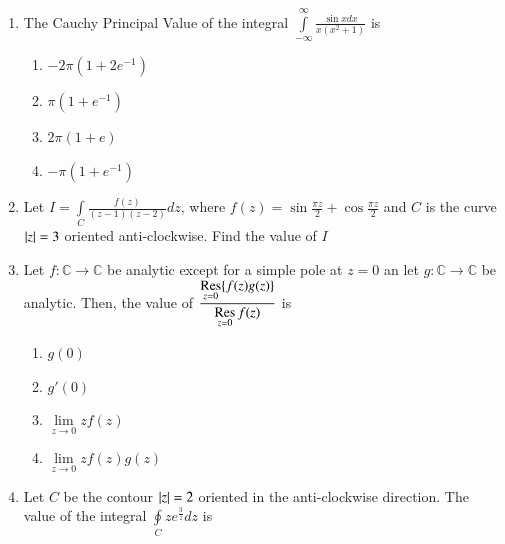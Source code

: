 \documentclass[journal,12pt,twocolumn]{IEEEtran}
\begin{document}
\begin{enumerate}[1.]
\begin{enumerate}
\end{enumerate}

\item The Cauchy Principal Value of the integral $\int\limits_{-\infty}^{\infty} \frac{\sin x dx}{x(x^2+1)} $ is


\begin{enumerate}

\item $
-2 \pi(1+2 e^{-1})
$

\item $
\pi(1+e^{-1})
$

\item $
2 \pi(1+e) 
$

\item $
- \pi(1+e^{-1})
$

\end{enumerate}

\item Let $ I=\int\limits_{C} \frac{f(z)}{(z-1)(z-2)} dz$, where $f(z)= \sin \frac{\pi z}{2} + \cos \frac{\pi z}{2} $ and $C$ is the curve $  \left\vert z\right\vert  =3 $ oriented anti-clockwise. Find the value of $I$ 

%
%
%
%
%

\item Let $ f : \mathbb{C} \rightarrow \mathbb{C} $ be analytic except for a simple pole at $z=0$ an let $ g : \mathbb{C} \rightarrow \mathbb{C} $ be analytic.
Then, the value of $\dfrac{\operatorname*{Res}\limits_{z=0} \lbrace f(z)g(z)\rbrace }{\operatorname*{Res}\limits_{z=0} f(z)} $ is

\begin{enumerate}

\item $
g(0)
$

\item $
g'(0)
$

\item $
\lim\limits_{z \to 0} z f(z)
$
       
\item $
\lim\limits_{z \to 0} z f(z) g(z)
$

\end{enumerate}

\item Let $C$ be the contour $ \left\vert z\right\vert= 2$ oriented in the anti-clockwise direction. The value of the integral $\oint\limits_{C} z e ^{\frac{3}{z}} dz $ is


\end{enumerate}
\end{document}
